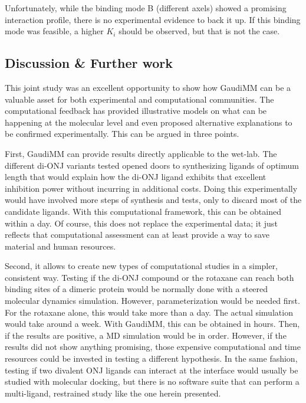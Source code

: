 Unfortunately, while the binding mode B (different axels) showed a promising interaction profile, there is no experimental evidence to back it up. If this binding mode was feasible, a higher $K_{i}$ should be observed, but that is not the case.

\subsection{Discussion \& Further work}
This joint study was an excellent opportunity to show how GaudiMM can be a valuable asset for both experimental and computational communities. The computational feedback has provided illustrative models on what can be happening at the molecular level and even proposed alternative explanations to be confirmed experimentally. This can be argued in three points.

First, GaudiMM can provide results directly applicable to the wet-lab. The different di-ONJ variants tested opened doors to synthesizing ligands of optimum length that would explain how the di-ONJ ligand exhibits that excellent inhibition power without incurring in additional costs. Doing this experimentally would have involved more steps of synthesis and tests, only to discard most of the candidate ligands. With this computational framework, this can be obtained within a day. Of course, this does not replace the experimental data; it just reflects that computational assessment can at least provide a way to save material and human resources.

Second, it allows to create new types of computational studies in a simpler, consistent way. Testing if the di-ONJ compound or the rotaxane can reach both binding sites of a dimeric protein would be normally done with a steered molecular dynamics simulation. However, parameterization would be needed first. For the rotaxane alone, this would take more than a day. The actual simulation would take around a week. With GaudiMM, this can be obtained in hours. Then, if the results are positive, a MD simulation would be in order. However, if the results did not show anything promising, those expensive computational and time resources could be invested in testing a different hypothesis. In the same fashion, testing if two divalent ONJ ligands can interact at the interface would usually be studied with molecular docking, but there is no software suite that can perform a multi-ligand, restrained study like the one herein presented.

